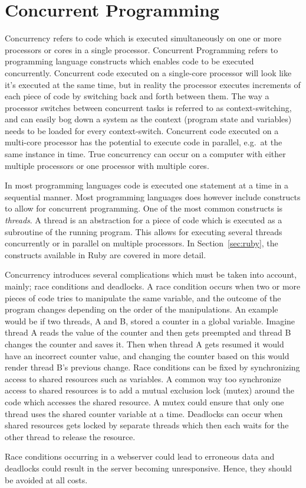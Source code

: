 \section{Concurrent Programming} %
\label{sec:concurrent}
Concurrency refers to code which is executed simultaneously on one or more
processors or cores in a single processor. Concurrent Programming refers to
programming language constructs which enables code to be executed concurrently.
Concurrent code executed on a single-core processor will look like it's executed
at the same time, but in reality the processor executes increments of each piece
of code by switching back and forth between them. The way a processor switches
between concurrent tasks is referred to as context-switching, and can easily bog
down a system as the context (program state and variables) needs to be loaded
for every context-switch.  Concurrent code executed on a multi-core processor
has the potential to execute code in parallel, e.g.\ at the same instance in
time. True concurrency can occur on a computer with either multiple processors
or one processor with multiple cores.

In most programming languages code is executed one statement at a time in a
sequential manner. Most programming languages does however include constructs
to allow for concurrent programming.  One of the most common constructs is
\textit{threads}. A thread is an abstraction for a piece of code which is
executed as a subroutine of the running program. This allows for executing
several threads concurrently or in parallel on multiple processors.  In
Section~\ref{sec:ruby}, the constructs available in Ruby are covered in more
detail.

Concurrency introduces several complications which must be taken into account,
mainly; race conditions and deadlocks. A race condition occurs when two or more
pieces of code tries to manipulate the same variable, and the outcome of the
program changes depending on the order of the manipulations. An example would be
if two threads, A and B, stored a counter in a global variable. Imagine thread A 
reads the value of the counter and then gets preempted and thread B changes
the counter and saves it. Then when thread A gets resumed it would have an
incorrect counter value, and changing the counter based on this would render
thread B's previous change. Race conditions can be fixed by synchronizing access
to shared resources such as variables. A common way too synchronize access to
shared resources is to add a mutual exclusion lock (mutex) around the code which
accesses the shared resource. A mutex could ensure that only one thread uses the
shared counter variable at a time. Deadlocks can occur when shared resources gets
locked by separate threads which then each waits for the other thread to
release the resource.

Race conditions occurring in a webserver could lead to erroneous data and
deadlocks could result in the server becoming unresponsive. Hence, they should
be avoided at all costs.


